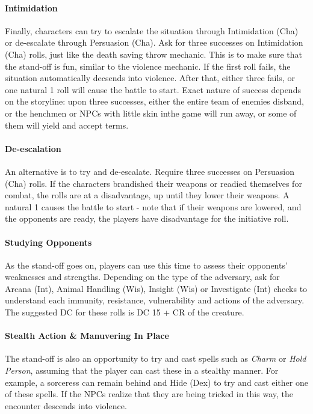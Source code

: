 \documentclass[twocolumn]{dndbook}
\begin{document}
\paragraph*{Intimidation}
Finally, characters can try to escalate the situation through Intimidation (Cha) or de-escalate through Persuasion (Cha).
Ask for three successes on Intimidation (Cha) rolls, just like the death saving throw mechanic.
This is to make sure that the stand-off is fun, similar to the violence mechanic.
If the first roll fails, the situation automatically decsends into violence.
After that, either three fails, or one natural 1 roll will cause the battle to start.
Exact nature of success depends on the storyline:
upon three successes, either the entire team of enemies disband, or the henchmen or NPCs with little skin inthe game will run away, or some of them will yield and accept terms.\par

\paragraph*{De-escalation}
An alternative is to try and de-escalate.
Require three successes on Persuasion (Cha) rolls.
If the characters brandished their weapons or readied themselves for combat, the rolls are at a disadvantage, up until they lower their weapons.
A natural 1 causes the battle to start - note that if their weapons are lowered, and the opponents are ready, the players have disadvantage for the initiative roll.
\par

\paragraph*{Studying Opponents}
As the stand-off goes on, players can use this time to assess their opponents' weaknesses and strengths.
Depending on the type of the adversary, ask for Arcana (Int), Animal Handling (Wis), Insight (Wis) or Investigate (Int) checks to understand each immunity, resistance, vulnerability and actions of the adversary.
The suggested DC for these rolls is DC 15 + CR of the creature.\par

\paragraph*{Stealth Action \& Manuvering In Place}
The stand-off is also an opportunity to try and cast spells such as \emph{Charm} or \emph{Hold Person}, assuming that the player can cast these in a stealthy manner.
For example, a sorceress can remain behind and Hide (Dex) to try and cast either one of these spells.
If the NPCs realize that they are being tricked in this way, the encounter descends into violence.\par
\end{document}
